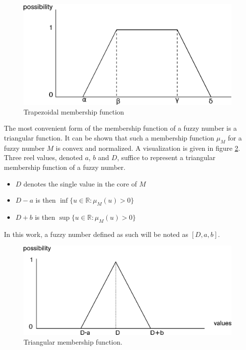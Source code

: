 \begin{figure}[h!]
  \centering
  \includegraphics[scale=0.4]{graphs/trapezoidalDistribution.eps}
  \caption{Trapezoidal membership function}
  \label{fig:trapezoidal}
\end{figure}

The most convenient form of the membership function of a fuzzy number is a triangular function. It can be shown that such a membership function $\mu_M$ for a fuzzy number $M$ is convex and normalized. A visualization is given in figure \ref{fig:triangular}. Three reel values, denoted $a$, $b$ and $D$, suffice to represent a triangular membership function of a fuzzy number.
\begin{itemize}
\item
$D$ denotes the single value in the core of $M$
\item
$D-a$ is then $\inf \{u \in \mathbb{R} : \mu_{M}(u) > 0\}$
\item
$D+b$ is then $\sup \{u \in \mathbb{R} : \mu_{M}(u) > 0\}$
\end{itemize}
In this work, a fuzzy number defined as such will be noted as $\left[D, a, b \right]$.
\begin{figure}[h!]
  \centering
  \includegraphics[scale=0.4]{graphs/triangular.eps}
  \caption{Triangular membership function.}
  \label{fig:triangular}
\end{figure}


